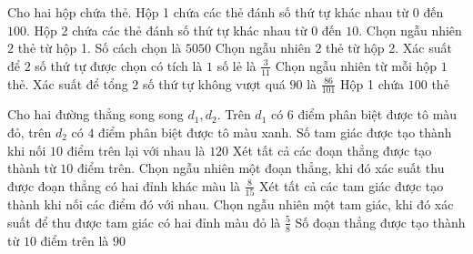 \begin{ex}Cho hai hộp chứa thẻ. Hộp 1 chứa các thẻ đánh số thứ tự khác nhau từ $0$ đến $100$. Hộp 2 chứa các thẻ đánh số thứ tự khác nhau từ $0$ đến $10$.
    \choiceTF
    {\True Chọn ngẫu nhiên $2$ thẻ từ hộp 1. Số cách chọn là $5050$}
    {Chọn ngẫu nhiên $2$ thẻ từ hộp 2. Xác suất để $2$ số thứ tự được chọn có tích là $1$ số lẻ là $\frac{3}{11}$}
    {\True Chọn ngẫu nhiên từ mỗi hộp $1$ thẻ. Xác suất để tổng $2$ số thứ tự không vượt quá $90$ là $\frac{86}{101}$}
    {Hộp 1 chứa $100$ thẻ}
\end{ex}
\begin{ex}
    Cho hai đường thẳng song song $d_1, d_2$. Trên $d_1$ có $6$ điểm phân biệt được tô màu đỏ, trên $d_2$ có $4$ điểm phân biệt được tô màu xanh.
    \choiceTF
    {Số tam giác được tạo thành khi nối $10$ điểm trên lại với nhau là $120$}
    {\True Xét tất cả các đoạn thẳng được tạo thành từ $10$ điểm trên. Chọn ngẫu nhiên một đoạn thẳng, khi đó xác suất thu được đoạn thẳng có hai đỉnh khác màu là $\frac{8}{15}$}
    {\True Xét tất cả các tam giác được tạo thành khi nối các điểm đó với nhau. Chọn ngẫu nhiên một tam giác, khi đó xác suất để thu được tam giác có hai đỉnh màu đỏ là $\frac{5}{8}$}
    {Số đoạn thẳng được tạo thành từ $10$ điểm trên là $90$}
\end{ex}
